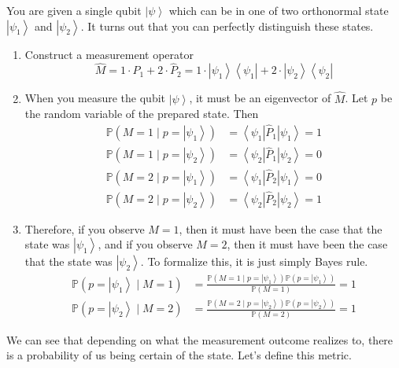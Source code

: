 \documentclass{article}
\newcommand{\ket}[1]{\ensuremath{\left|#1\right\rangle}}
\newcommand{\bra}[1]{\ensuremath{\left\langle#1\right|}}
\begin{document}
    \begin{example}
      You are given a single qubit $\ket{\psi}$ which can be in one of two orthonormal state $\ket{\psi_1}$ and $\ket{\psi_2}$. It turns out that you can perfectly distinguish these states. 
      \begin{enumerate}
        \item Construct a measurement operator 
          \begin{equation}
            \hat{M} = 1 \cdot \hat{P}_1 + 2 \cdot \hat{P}_2 = 1 \cdot \ket{\psi_1} \bra{\psi_1} + 2 \cdot \ket{\psi_2} \bra{\psi_2} 
          \end{equation}
        \item When you measure the qubit $\ket{\psi}$, it must be an eigenvector of $\hat{M}$. Let $p$ be the random variable of the prepared state. Then 
          \begin{align}
            \mathbb{P}(M = 1 \mid p = \ket{\psi_1}) & = \bra{\psi_1} \hat{P}_1 \ket{\psi_1} = 1 \\ 
            \mathbb{P}(M = 1 \mid p = \ket{\psi_2}) & = \bra{\psi_2} \hat{P}_1 \ket{\psi_2} = 0 \\ 
            \mathbb{P}(M = 2 \mid p = \ket{\psi_1}) & = \bra{\psi_1} \hat{P}_2 \ket{\psi_1} = 0 \\
            \mathbb{P}(M = 2 \mid p = \ket{\psi_2}) & = \bra{\psi_2} \hat{P}_2 \ket{\psi_2} = 1
          \end{align}

        \item Therefore, if you observe $M = 1$, then it must have been the case that the state was $\ket{\psi_1}$, and if you observe $M = 2$, then it must have been the case that the state was $\ket{\psi_2}$. To formalize this, it is just simply Bayes rule. 
          \begin{align}
            \mathbb{P}(p = \ket{\psi_1} \mid M = 1) & = \frac{\mathbb{P}(M = 1 \mid p = \ket{\psi_1}) \mathbb{P}(p = \ket{\psi_1})}{\mathbb{P}(M = 1)} = 1 \\
            \mathbb{P}(p = \ket{\psi_2} \mid M = 2) & = \frac{\mathbb{P}(M = 2 \mid p = \ket{\psi_2}) \mathbb{P}(p = \ket{\psi_2})}{\mathbb{P}(M = 2)} = 1
          \end{align}
      \end{enumerate}
    \end{example}

    We can see that depending on what the measurement outcome realizes to, there is a probability of us being certain of the state. Let's define this metric. 
\end{document}
